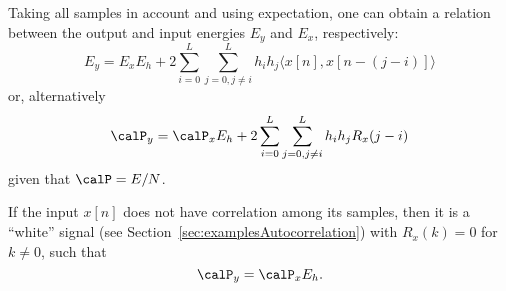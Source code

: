 
Taking all samples in account and using expectation, one can obtain a relation between the output and input energies $E_y$ and $E_x$, respectively:
\[
E_y = E_x E_h + 2 \sum_{i=0}^L \sum_{j=0, j \ne i}^L h_i h_j \langle x[n],x[n-(j-i)] \rangle
\]
or, alternatively
\[
\calP_y = \calP_x E_h + 2 \sum_{i=0}^L \sum_{j=0, j \ne i}^L h_i h_j R_x(j-i)
\]
given that $\calP = E/N$.

If the input $x[n]$ does not have correlation among its samples, then it is a ``white'' signal (see Section~\ref{sec:examplesAutocorrelation}) with $R_x(k)=0$ for $k \ne 0$, such that
\begin{equation}
\calP_y = \calP_x E_h.
\label{eq:powerOutputLTI}
\end{equation}
\eTheorem

